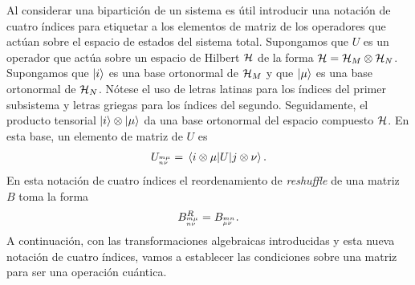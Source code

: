 Al considerar una bipartición de un sistema es útil introducir una notación
de cuatro índices para etiquetar a los elementos de matriz de los operadores
que actúan sobre el espacio de estados del sistema total. 
Supongamos que $U$ es un operador que actúa sobre un espacio de Hilbert 
$\mathcal{H}$ de la forma $\mathcal{H}=\mathcal{H}_M\otimes\mathcal{H}_N$.
Supongamos que $\ket{i}$ es una base ortonormal de $\mathcal{H}_M$ 
y que $\ket{\mu}$ es una base ortonormal de $\mathcal{H}_N$. 
Nótese el uso de letras latinas para los índices del
primer subsistema y letras griegas para los índices del segundo.
Seguidamente, el producto tensorial $\ket{i}\otimes\ket{\mu}$
da una base ortonormal del espacio compuesto $\mathcal{H}$. 
En esta base, un elemento de matriz de $U$ es
\begin{align}
U_\ind{m\mu}{n\nu}=\matrixel{i\otimes \mu}{U}{j\otimes \nu}.
\label{eq:4indices}
\end{align}
En esta notación de cuatro índices el reordenamiento 
de \textit{reshuffle} de una matriz  $B$ toma la 
forma~\cite{bengtsson_zyczkowski_2017}
\begin{align}
B^R_{{}^{m\mu}_{n\nu}} = B_{{}^{mn}_{\mu\nu}}.
\label{eq:R-4ind}
\end{align}
A continuación, con las transformaciones algebraicas introducidas y
esta nueva notación de cuatro índices,
vamos a establecer las condiciones sobre una matriz para ser una 
operación cuántica. 
 

